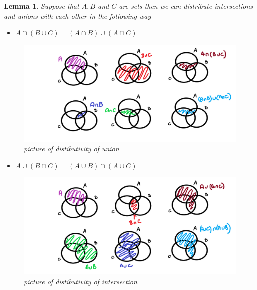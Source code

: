 \documentclass[
]{book}
\providecommand{\tightlist}{%
  \setlength{\itemsep}{0pt}\setlength{\parskip}{0pt}}
\newtheorem{lemma}{Lemma}[chapter]
\theoremstyle{definition}
\theoremstyle{definition}
\theoremstyle{definition}
\theoremstyle{definition}
\theoremstyle{remark}
\begin{document}
\begin{lemma}

Suppose that \(A, B\) and \(C\) are sets then we can distribute intersections and unions with each other in the following way

\begin{itemize}
\tightlist
\item
  \(A \cap (B \cup C) = (A \cap B) \cup (A \cap C)\)
\end{itemize}

\begin{figure}
\centering
\includegraphics{distributive1.png}
\caption{\label{fig:unnamed-chunk-13}picture of distibutivity of union}
\end{figure}

\begin{itemize}
\tightlist
\item
  \(A\cup (B \cap C) = (A \cup B) \cap (A \cup C)\)
\end{itemize}

\begin{figure}
\centering
\includegraphics{distributive2.png}
\caption{\label{fig:unnamed-chunk-14}picture of distibutivity of intersection}
\end{figure}

\end{lemma}
\end{document}

